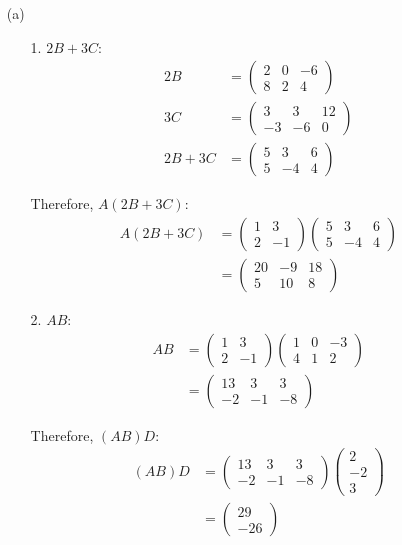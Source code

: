 \documentclass{article}
\begin{document}
\begin{enumerate}
\item[(a)] 

\begin{enumerate}
\item[1.] $2B + 3C$:
\begin{align*}
2B &= \begin{pmatrix} 2 & 0 & -6 \\ 8 & 2 & 4 \end{pmatrix} \\
3C &= \begin{pmatrix} 3 & 3 & 12 \\ -3 & -6 & 0 \end{pmatrix} \\
2B + 3C &= \begin{pmatrix} 5 & 3 & 6 \\ 5 & -4 & 4 \end{pmatrix}
\end{align*}

Therefore, $A(2B + 3C)$:
\begin{align*}
A(2B + 3C) &= \begin{pmatrix} 1 & 3 \\ 2 & -1 \end{pmatrix} \begin{pmatrix} 5 & 3 & 6 \\ 5 & -4 & 4 \end{pmatrix} \\
&= \begin{pmatrix} 20 & -9 & 18 \\ 5 & 10 & 8 \end{pmatrix}
\end{align*}

\item[2.] $AB$:
\begin{align*}
AB &= \begin{pmatrix} 1 & 3 \\ 2 & -1 \end{pmatrix} \begin{pmatrix} 1 & 0 & -3 \\ 4 & 1 & 2 \end{pmatrix} \\
&= \begin{pmatrix} 13 & 3 & 3 \\ -2 & -1 & -8 \end{pmatrix}
\end{align*}

Therefore, $(AB)D$:
\begin{align*}
(AB)D &= \begin{pmatrix} 13 & 3 & 3 \\ -2 & -1 & -8 \end{pmatrix} \begin{pmatrix} 2 \\ -2 \\ 3 \end{pmatrix} \\
&= \begin{pmatrix} 29 \\ -26 \end{pmatrix}
\end{align*}


\end{enumerate}
\end{enumerate}
\end{document}
